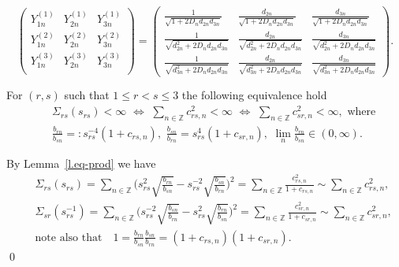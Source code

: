\documentclass[preprint,12pt]{elsarticle}
\newcommand{\commA}[1]{\marginpar{%
\begin{color}{red}
\vskip-\baselineskip %
\raggedright\footnotesize
\itshape\hrule \smallskip A: #1\par\smallskip\hrule\end{color}}}
\numberwithin{equation}{section}
\begin{document}
\begin{equation}
\label{Y^r_s(n)(d,d)}
\left(\begin{array}{ccc}
Y_{1n}^{(1)}&Y_{2n}^{(1)}&Y_{3n}^{(1)}\\
Y_{1n}^{(2)}&Y_{2n}^{(2)}&Y_{3n}^{(2)}\\
Y_{1n}^{(3)}&Y_{2n}^{(3)}&Y_{3n}^{(3)}\\
 \end{array}\right)=
 \left(
\begin{array}{ccc}
\frac{1}{\sqrt{1\!+\!2D_nd_{2n}d_{3n}}}&
\frac{d_{2n}}{\sqrt{1\!+\!2D_nd_{2n}d_{3n}}}&
\frac{d_{3n}}{\sqrt{1\!+\!2D_nd_{2n}d_{3n}}}\\
%
\frac{1}{\sqrt{d_{2n}^2\!+\!2D_nd_{2n}d_{3n}}}&
\frac{d_{2n}}{\sqrt{d_{2n}^2\!+\!2D_nd_{2n}d_{3n}}}&
\frac{d_{3n}}{\sqrt{d_{2n}^2\!+\!2D_nd_{2n}d_{3n}}}\\
%
\frac{1}{\sqrt{d_{3n}^2\!+\!2D_nd_{2n}d_{3n}}}&
\frac{d_{2n}}{\sqrt{d_{3n}^2\!+\!2D_nd_{2n}d_{3n}}}&
\frac{d_{3n}}{\sqrt{d_{3n}^2\!+\!2D_nd_{2n}d_{3n}}}
\end{array}
\right).
\end{equation}
\begin{rem}
 \label{r.Sigma-123=(111)} 
For $(r,s)$ such that $1\leq r<s\leq 3$ the following equivalence hold 
%
%
\begin{eqnarray}
\label{Sigma(rs)(s)<}
 &&
 \Sigma_{rs}(s_{rs})\!<\!\infty\,\,\Leftrightarrow\,\,\sum_{n\in \mathbb Z}c^2_{rs,n}\!<\!\infty\,\,\Leftrightarrow\,\, \sum_{n\in \mathbb Z}c^2_{sr,n}\!<\!\infty,\,\, \text{where}\\
%
\label{c(rs,n)}
&&
\frac{b_{rn}}{b_{sn}}=:s^{-4}_{rs}(1+c_{rs,n}),\,\,\frac{b_{sn}}{b_{rn}}\!=\!s^4_{rs}(1\!+\!c_{sr,n}),\,\, \lim_n\frac{b_{rn}}{b_{sn}}\in (0,\infty).
\end{eqnarray}
\end{rem}
%
\begin{pf} 
By Lemma~\ref{l.eq-prod} we have
\begin{eqnarray}
 \nonumber
&&
\Sigma_{rs}(s_{rs})=
\sum_{n\in \mathbb Z}\Big(s_{rs}^2\sqrt{\frac{b_{rn}}{b_{sn}}}\!-\!
s_{rs}^{-2}\sqrt{\frac{b_{sn}}{b_{rn}}}\Big)^2=
\sum_{n\in \mathbb Z}\frac{c^2_{rs,n}}{1+c_{rs,n}}\sim \sum_{n\in \mathbb Z}c^2_{rs,n},\\
 \nonumber
&& 
\Sigma_{sr}(s^{-1}_{rs})=
%
\sum_{n\in \mathbb Z}\Big(s_{rs}^{-2}\sqrt{\frac{b_{sn}}{b_{rn}}}\!-\!
s_{rs}^2\sqrt{\frac{b_{rn}}{b_{sn}}}\Big)^2=
%
\sum_{n\in \mathbb Z}\frac{c^2_{sr,n}}{1+c_{sr,n}}\sim \sum_{n\in \mathbb Z}c^2_{sr,n},
\\
\label{(1+c)(1+e)=1}
&&
\text{note also that}\quad  1=\frac{b_{rn}}{b_{sn}}\frac{b_{sn}}{b_{rn}}=(1\!+\!c_{rs,n})(1\!+\!c_{sr,n}). 
\end{eqnarray}
\qed\end{pf}
\end{document}
